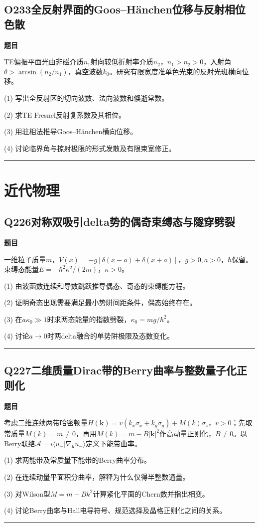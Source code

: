 \documentclass[UTF8,a4paper,11pt,oneside,openany]{ctexbook}
\begin{document}
\section*{O233\quad 全反射界面的Goos–Hänchen位移与反射相位色散}
\textbf{题目}\par
TE偏振平面光由非磁介质$n_1$射向较低折射率介质$n_2$，$n_1>n_2>0$，入射角$\theta>\arcsin(n_2/n_1)$，真空波数$k_0$。研究有限宽度准单色光束的反射光斑横向位移。
\par\smallskip\noindent (1) 写出全反射区的切向波数、法向波数和倏逝常数。
\par\smallskip\noindent (2) 求TE Fresnel反射复系数及其相位。
\par\smallskip\noindent (3) 用驻相法推导Goos–Hänchen横向位移。
\par\smallskip\noindent (4) 讨论临界角与掠射极限的形式发散及有限束宽修正。
\par\medskip\hrule\medskip
\chapter{近代物理}
\section*{Q226\quad 对称双吸引delta势的偶奇束缚态与隧穿劈裂}
\textbf{题目}\par
一维粒子质量$m$，$V(x)=-g[\delta(x-a)+\delta(x+a)]$，$g>0,a>0$，$\hbar$保留。束缚态能量$E=-\hbar^2\kappa^2/(2m)$，$\kappa>0$。
\par\smallskip\noindent (1) 由波函数连续和导数跳跃推导偶态、奇态的束缚能方程。
\par\smallskip\noindent (2) 证明奇态出现需要满足最小势阱间距条件，偶态始终存在。
\par\smallskip\noindent (3) 在$a\kappa_0\gg1$时求两态能量的指数劈裂，$\kappa_0=mg/\hbar^2$。
\par\smallskip\noindent (4) 讨论$a\to0$时两delta融合的单势阱极限及态数变化。
\par\medskip\hrule\medskip
\section*{Q227\quad 二维质量Dirac带的Berry曲率与整数量子化正则化}
\textbf{题目}\par
考虑二维连续两带哈密顿量$H(\boldsymbol k)=v(k_x\sigma_x+k_y\sigma_y)+M(k)\sigma_z$，$v>0$；先取常质量$M(k)=m\ne0$，再用$M(k)=m-B|\boldsymbol k|^2$作高动量正则化，$B\ne0$。以Berry联络$\mathcal A=i\langle u_-|\nabla_{\boldsymbol k}u_-\rangle$定义下能带曲率。
\par\smallskip\noindent (1) 求两能带及常质量下能带的Berry曲率分布。
\par\smallskip\noindent (2) 在连续动量平面积分曲率，解释为什么仅得半整数通量。
\par\smallskip\noindent (3) 对Wilson型$M=m-Bk^2$计算紧化平面的Chern数并指出相变。
\par\smallskip\noindent (4) 讨论Berry曲率与Hall电导符号、规范选择及晶格正则化之间的关系。
\par\medskip\hrule\medskip
\end{document}
